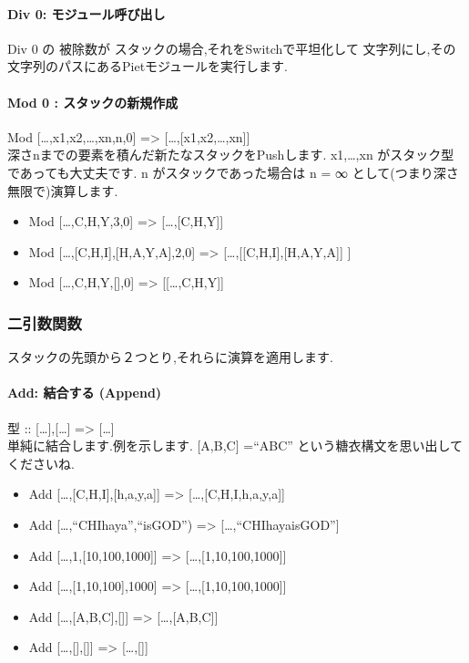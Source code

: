 \paragraph{Div 0: モジュール呼び出し}

Div 0 の 被除数が スタックの場合,それをSwitchで平坦化して
文字列にし,その文字列のパスにあるPietモジュールを実行します.

\paragraph{Mod 0 : スタックの新規作成}

Mod {[}\ldots{},x1,x2,\ldots{},xn,n,0{]} =\textgreater{}
{[}\ldots{},{[}x1,x2,\ldots{},xn{]}{]}\\深さnまでの要素を積んだ新たなスタックをPushします.
x1,\ldots{},xn がスタック型であっても大丈夫です. n
がスタックであった場合は n = ∞ として(つまり深さ無限で)演算します.

\begin{itemize}
\item
  Mod {[}\ldots{},C,H,Y,3,0{]} =\textgreater{}
  {[}\ldots{},{[}C,H,Y{]}{]}
\item
  Mod {[}\ldots{},{[}C,H,I{]},{[}H,A,Y,A{]},2,0{]} =\textgreater{}
  {[}\ldots{},{[}{[}C,H,I{]},{[}H,A,Y,A{]}{]} {]}
\item
  Mod {[}\ldots{},C,H,Y,{[}{]},0{]} =\textgreater{}
  {[}{[}\ldots{},C,H,Y{]}{]}
\end{itemize}

\subsubsection{二引数関数}

スタックの先頭から２つとり,それらに演算を適用します.

\paragraph{Add: 結合する (Append)}

型 :: {[}\ldots{}{]},{[}\ldots{}{]} =\textgreater{}
{[}\ldots{}{]}\\単純に結合します.例を示します. {[}A,B,C{]} =``ABC''
という糖衣構文を思い出してくださいね.

\begin{itemize}
\item
  Add {[}\ldots{},{[}C,H,I{]},{[}h,a,y,a{]}{]} =\textgreater{}
  {[}\ldots{},{[}C,H,I,h,a,y,a{]}{]}
\item
  Add {[}\ldots{},``CHIhaya'',``isGOD'') =\textgreater{}
  {[}\ldots{},``CHIhayaisGOD''{]}
\item
  Add {[}\ldots{},1,{[}10,100,1000{]}{]} =\textgreater{}
  {[}\ldots{},{[}1,10,100,1000{]}{]}
\item
  Add {[}\ldots{},{[}1,10,100{]},1000{]} =\textgreater{}
  {[}\ldots{},{[}1,10,100,1000{]}{]}
\item
  Add {[}\ldots{},{[}A,B,C{]},{[}{]}{]} =\textgreater{}
  {[}\ldots{},{[}A,B,C{]}{]}
\item
  Add {[}\ldots{},{[}{]},{[}{]}{]} =\textgreater{} {[}\ldots{},{[}{]}{]}
\end{itemize}

